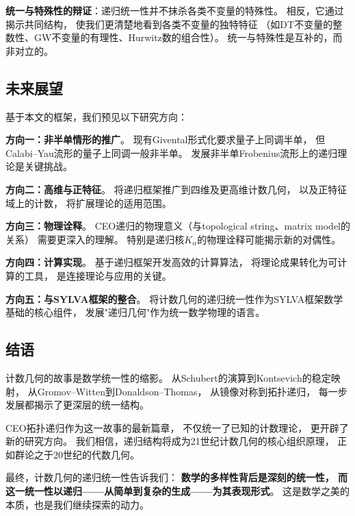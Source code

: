 \textbf{统一与特殊性的辩证}：递归统一性并不抹杀各类不变量的特殊性。
相反，它通过揭示共同结构，
使我们更清楚地看到各类不变量的独特特征
（如DT不变量的整数性、GW不变量的有理性、Hurwitz数的组合性）。
统一与特殊性是互补的，而非对立的。

\subsection{未来展望}

基于本文的框架，我们预见以下研究方向：

\textbf{方向一：非半单情形的推广}。
现有Givental形式化要求量子上同调半单，
但Calabi--Yau流形的量子上同调一般非半单。
发展非半单Frobenius流形上的递归理论是关键挑战。

\textbf{方向二：高维与正特征}。
将递归框架推广到四维及更高维计数几何，
以及正特征域上的计数，
将扩展理论的适用范围。

\textbf{方向三：物理诠释}。
CEO递归的物理意义（与topological string、matrix model的关系）
需要更深入的理解。
特别是递归核$K_\alpha$的物理诠释可能揭示新的对偶性。

\textbf{方向四：计算实现}。
基于递归框架开发高效的计算算法，
将理论成果转化为可计算的工具，
是连接理论与应用的关键。

\textbf{方向五：与SYLVA框架的整合}。
将计数几何的递归统一性作为SYLVA框架数学基础的核心组件，
发展"递归几何"作为统一数学物理的语言。

\subsection{结语}

计数几何的故事是数学统一性的缩影。
从Schubert的演算到Kontsevich的稳定映射，
从Gromov--Witten到Donaldson--Thomas，
从镜像对称到拓扑递归，
每一步发展都揭示了更深层的统一结构。

CEO拓扑递归作为这一故事的最新篇章，
不仅统一了已知的计数理论，
更开辟了新的研究方向。
我们相信，递归结构将成为21世纪计数几何的核心组织原理，
正如群论之于20世纪的代数几何。

最终，计数几何的递归统一性告诉我们：
\textbf{数学的多样性背后是深刻的统一性，
而这一统一性以递归——从简单到复杂的生成——为其表现形式}。
这是数学之美的本质，也是我们继续探索的动力。


